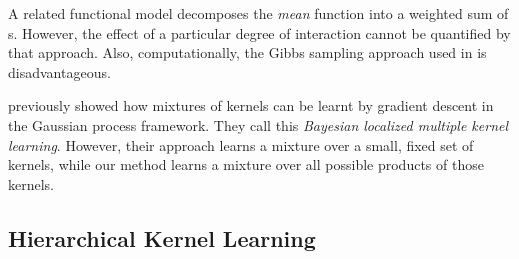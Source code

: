 A related functional \ANOVA{} \gp{} model \citep{kaufman2010bayesian} decomposes the \emph{mean} function into a weighted sum of \gp{}s.
However, the effect of a particular degree of interaction cannot be quantified by that approach.
Also, computationally, the Gibbs sampling approach used in \citep{kaufman2010bayesian} is disadvantageous.


\citet{christoudias2009bayesian} previously showed how mixtures of kernels can be learnt by gradient descent in the Gaussian process framework.  They call this \emph{Bayesian localized multiple kernel learning}.
However, their approach learns a mixture over a small, fixed set of kernels, while our method learns a mixture over all possible products of those kernels.

\subsection{Hierarchical Kernel Learning}


